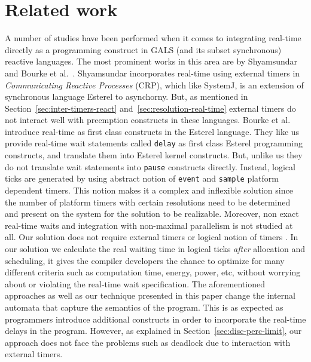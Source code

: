 \section{Related work}
\label{sec:related-work}


A number of studies have been performed when it comes to integrating
real-time directly as a programming construct in GALS (and its subset
synchronous) reactive languages. The most prominent works in this area
are by Shyamsundar~\cite{rsh94} and Bourke et al.~\cite{Bourke2009a}.
Shyamsundar incorporates real-time using external timers in
\textit{Communicating Reactive Processes} (CRP), which like SystemJ, is
an extension of synchronous language Esterel to asynchorny. But, as
mentioned in Section~\ref{sec:inter-timers-react}
and~\ref{sec:resolution-real-time} external timers do not interact well
with preemption constructs in these languages. Bourke et al. introduce
real-time as first class constructs in the Esterel language. They like
us provide real-time wait statements called \texttt{delay} as first
class Esterel programming constructs, and translate them into Esterel
kernel constructs. But, unlike us they do not translate wait statements
into \texttt{pause} constructs directly. Instead, logical ticks are
generated by using abstract notion of \texttt{event} and \texttt{sample}
platform dependent timers. This notion makes it a complex and inflexible
solution since the number of platform timers with certain resolutions
need to be determined and present on the system for the solution to be
realizable. Moreover, non exact real-time waits and integration with
non-maximal parallelism is not studied at all. Our solution does not
require external timers \cite{rsh94} or logical notion of timers
\cite{Bourke2009a}. In our solution we calculate the real waiting time
in logical ticks \textit{after} allocation and scheduling, it gives the
compiler developers the chance to optimize for many different criteria
such as computation time, energy, power, etc, without worrying about or
violating the real-time wait specification. The aforementioned
approaches \cite{rsh94,Bourke2009a} as well as our technique presented
in this paper cha\-nge the internal automata that capture the semantics
of the program. This is as expected as programmers introduce additional
constructs in order to incorporate the real-time delays in the
program. However, as explained in Section~\ref{sec:disc-perc-limit}, our
approach does not face the problems such as deadlock due to interaction
with external timers.


